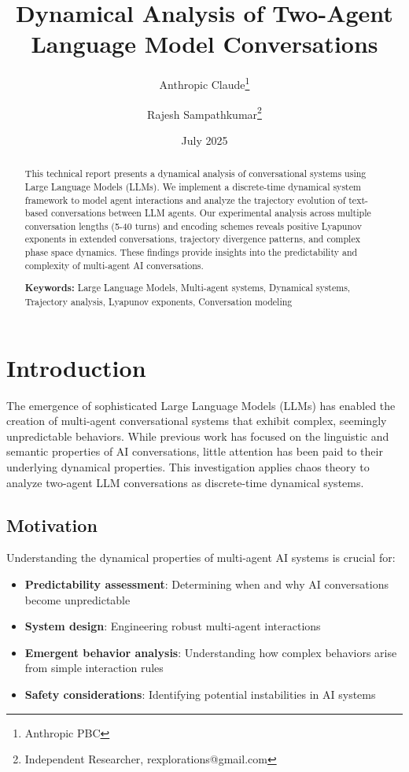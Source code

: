\documentclass[11pt,a4paper]{article}
\title{Dynamical Analysis of Two-Agent Language Model Conversations}
\author{Anthropic Claude\thanks{Anthropic PBC} \and Rajesh Sampathkumar\thanks{Independent Researcher, rexplorations@gmail.com}}
\date{July 2025}
\begin{document}
\maketitle

\begin{abstract}
This technical report presents a dynamical analysis of conversational systems using Large Language Models (LLMs). We implement a discrete-time dynamical system framework to model agent interactions and analyze the trajectory evolution of text-based conversations between LLM agents. Our experimental analysis across multiple conversation lengths (5-40 turns) and encoding schemes reveals positive Lyapunov exponents in extended conversations, trajectory divergence patterns, and complex phase space dynamics. These findings provide insights into the predictability and complexity of multi-agent AI conversations.

\textbf{Keywords:} Large Language Models, Multi-agent systems, Dynamical systems, Trajectory analysis, Lyapunov exponents, Conversation modeling
\end{abstract}

\section{Introduction}

The emergence of sophisticated Large Language Models (LLMs) has enabled the creation of multi-agent conversational systems that exhibit complex, seemingly unpredictable behaviors. While previous work has focused on the linguistic and semantic properties of AI conversations, little attention has been paid to their underlying dynamical properties. This investigation applies chaos theory to analyze two-agent LLM conversations as discrete-time dynamical systems.

\subsection{Motivation}

Understanding the dynamical properties of multi-agent AI systems is crucial for:
\begin{itemize}
    \item \textbf{Predictability assessment}: Determining when and why AI conversations become unpredictable
    \item \textbf{System design}: Engineering robust multi-agent interactions
    \item \textbf{Emergent behavior analysis}: Understanding how complex behaviors arise from simple interaction rules
    \item \textbf{Safety considerations}: Identifying potential instabilities in AI systems
\end{itemize}
\end{document}
